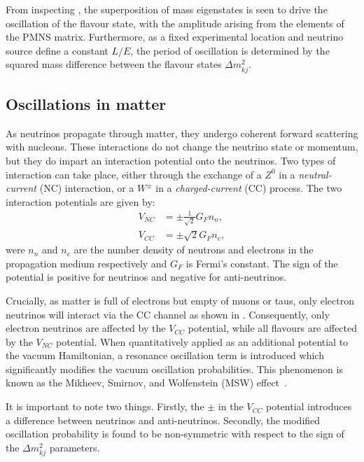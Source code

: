 From inspecting , the superposition of mass eigenstates is seen to
drive the oscillation of the flavour state, with the amplitude arising from the elements of the
PMNS matrix. Furthermore, as a fixed experimental location and neutrino source define a constant
$L/E$, the period of oscillation is determined by the squared mass difference between the flavour
states $\Delta m_{kj}^{2}$.

\subsection{Oscillations in matter} %
\label{sec:theory_oscillations_matter} %

As neutrinos propagate through matter, they undergo coherent forward scattering with nucleons.
These interactions do not change the neutrino state or momentum, but they do impart an interaction
potential onto the neutrinos. Two types of interaction can take place, either through the exchange
of a $Z^{0}$ in a \emph{neutral-current} (NC) interaction, or a $W^{\pm}$ in a
\emph{charged-current} (CC) process. The two interaction potentials are given by:
\begin{align} %
    V_{NC} & = \pm\frac{1}{\sqrt{2}}G_{F}n_{n}, \\
    V_{CC} & = \pm\sqrt{2}G_{F}n_{e},
\end{align}
were $n_{n}$ and $n_{e}$ are the number density of neutrons and electrons in the propagation
medium respectively and $G_{F}$ is Fermi's constant. The sign of the potential is positive for
neutrinos and negative for anti-neutrinos.

Crucially, as matter is full of electrons but empty of muons or taus, only electron neutrinos will
interact via the CC channel as shown in . Consequently, only
electron neutrinos are affected by the $V_{CC}$ potential, while all flavours are affected by the
$V_{NC}$ potential. When quantitatively applied as an additional potential to the vacuum
Hamiltonian, a resonance oscillation term is introduced which significantly modifies the vacuum
oscillation probabilities. This phenomenon is known as the Mikheev, Smirnov, and Wolfenstein (MSW)
effect~\cite{wolfenstein1978, mikheev1986}.

It is important to note two things. Firstly, the $\pm$ in the $V_{CC}$ potential introduces a
difference between neutrinos and anti-neutrinos. Secondly, the modified oscillation probability is
found to be non-symmetric with respect to the sign of the $\Delta m_{kj}^{2}$ parameters.

